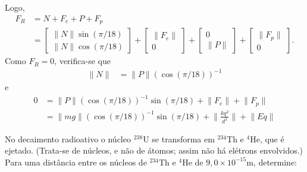 \documentclass[a4paper,12pt, leqno, answers]{exam}
\newcommand{\norm}[1]{\lVert #1 \rVert}
\begin{document}
\begin{questions}
\begin{solution}
    Logo,
    \begin{align*}
      F_R &= N + F_e + P + F_p \\
      &= \begin{bmatrix}
        \norm{N} \sin(\pi/18) \\
        \norm{N} \cos(\pi/18)
      \end{bmatrix} + \begin{bmatrix}
        \norm{F_e} \\
        0
      \end{bmatrix} + \begin{bmatrix}
        0 \\
        \norm{P}
      \end{bmatrix} + \begin{bmatrix}
        \norm{F_p} \\
        0
      \end{bmatrix}.
    \end{align*}
    Como $F_R = 0$, verifica-se que
    \begin{align*}
      \norm{N} &= \norm{P} \left( \cos(\pi/18) \right)^{-1}
    \end{align*}
    e
    \begin{align*}
      0 &= \norm{P} \left( \cos(\pi/18) \right)^{-1} \sin(\pi/18) + \norm{F_e} +
      \norm{F_p} \\
      &= \norm{m g} \left( \cos(\pi/18) \right)^{-1} \sin(\pi/18) + \norm{\frac{k
      q^2}{d^2}} + \norm{E q}
    \end{align*}
  \end{solution}

  \question No decaimento radioativo o núcleo $^{238}$U se transforma em
  $^{234}$Th e $^4$He, que \'{e} ejetado. (Trata-se de núcleos, e n\~{a}o de
  \'{a}tomos; assim n\~{a}o h\'{a} el\'{e}trons envolvidos.) Para uma
  dist\^{a}ncia entre os núcleos de $^{234}$Th e $^4$He de $9,0 \times
  10^{-15}$m, determine:
\end{questions}
\end{document}
